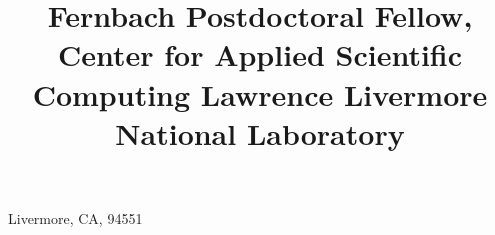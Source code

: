 
\title{\normalsize
	Fernbach Postdoctoral Fellow,
	Center for Applied Scientific Computing\newline
	Lawrence Livermore National Laboratory
}                       %
\address{}{Livermore, CA, 94551}    %





\newcommand{\see}[1]{\hfill{\itshape\color{see}\footnotesize{}see #1}}

\newcommand{\br}{\ifinner, \else\\\fi}

\newcommand{\github}[1]{\href{https://github.com/LLNL/#1}{#1}}

\makeatletter
\def\@bibitem#1{%
	\def\mykey{#1}%
	\item\if@filesw\immediate\write\@auxout {\string\bibcite{#1}%
	{\the\value{\@listctr}}}\fi\ignorespaces}


